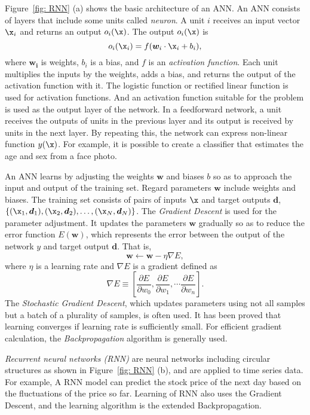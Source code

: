 \documentclass[../main.tex]{subfiles}
\begin{document}
Figure~\ref{fig: RNN} (a) shows the basic architecture of an ANN\@.  An ANN consists of layers that include some units called \emph{neuron}.
A unit $i$ receives an input vector $\x_i$ and returns an output $o_i(\x)$.
The output $o_i(\x)$ is
\begin{equation}
  o_i(\x_i) = f(\bm{w}_i \cdot \x_i + b_i),
\end{equation}
where $\bm{w_i}$ is weights, $b_i$ is a bias, and $f$ is an \emph{activation function}.
Each unit multiplies the inputs by the weights, adds a bias, and returns the output of the activation function with it.
The logistic function or rectified linear function is used for activation functions.
And an activation function suitable for the problem is used as the output layer of the network.
In a feedforward network, a unit receives the outputs of units in the previous layer and its output is received by units in the next layer.  By repeating this, the network can express non-linear function $y(\x)$.
For example, it is possible to create a classifier that estimates the age and sex from a face photo.

An ANN learns by adjusting the weights $\bm{w}$ and biases $b$ so as to approach the input and output of the training set.
Regard parameters $\bm{w}$ include weights and biases.
The training set consists of pairs of inputs $\x$ and target outputs $\bm{d}$, $\{(\x_1,\bm{d}_1), (\x_2,\bm{d}_2), \dots, (\x_N,\bm{d}_N)\}$.
The \emph{Gradient Descent} is used for the parameter adjustment.
It updates the parameters $\bm{w}$ gradually so as to reduce the error function $E(\bm{w})$, which represents the error between the output of the network $y$ and target output $\bm{d}$.  That is,
\begin{equation}
  \bm{w} \gets \bm{w} - \eta \nabla E,
\end{equation}
where $\eta$ is a learning rate and $\nabla E$ is a gradient defined as
\begin{equation}
  \nabla E \equiv \left[\frac{\partial E}{\partial w_{0}},
\frac{\partial E}{\partial w_{1}}, \cdots \frac{\partial E}{\partial
w_{n}}\right].
\end{equation}
The \emph{Stochastic Gradient Descent}, which updates parameters using not all samples but a batch of a plurality of samples, is often used.
It has been proved that learning converges if learning rate is sufficiently small.
For efficient gradient calculation, the \emph{Backpropagation} algorithm is generally used.

\emph{Recurrent neural networks (RNN)} are neural networks including circular structures as shown in Figure~\ref{fig: RNN} (b), and are applied to time series data.
For example, A RNN model can predict the stock price of the next day based on the fluctuations of the price so far.
Learning of RNN also uses the Gradient Descent, and the learning algorithm is the extended Backpropagation.
\end{document}
